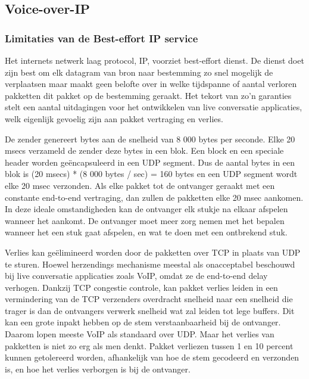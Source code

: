\subsection{Voice-over-IP}

\subsubsection{Limitaties van de Best-effort IP service}

Het internets netwerk laag protocol, IP, voorziet best-effort dienst. De dienst doet zijn best om elk datagram van bron naar bestemming zo snel mogelijk de verplaatsen maar maakt geen belofte over in welke tijdspanne of aantal verloren pakketten dit pakket op de bestemming geraakt. Het tekort van zo’n garanties stelt een aantal uitdagingen voor het ontwikkelen van live conversatie applicaties, welk eigenlijk gevoelig zijn aan pakket vertraging en verlies.

\noindent De zender genereert bytes aan de snelheid van 8 000 bytes per seconde. Elke 20 msecs verzameld de zender deze bytes in een blok. Een block en een speciale header worden geëncapsuleerd in een UDP segment. Dus de aantal bytes in een blok is (20 msecs) * (8 000 bytes / sec) = 160 bytes en een UDP segment wordt elke 20 msec verzonden.
Als elke pakket tot de ontvanger geraakt met een constante end-to-end vertraging, dan zullen de pakketten elke 20 msec aankomen. In deze ideale omstandigheden kan de ontvanger elk stukje na elkaar afspelen wanneer het aankomt.
De ontvanger moet meer zorg nemen met het bepalen wanneer het een stuk gaat afspelen, en wat te doen met een ontbrekend stuk.


Verlies kan geëlimineerd worden door de pakketten over TCP in plaats van UDP te sturen. Hoewel herzendings mechanisme meestal als onacceptabel beschouwd bij live conversatie applicaties zoals VoIP, omdat ze de end-to-end delay verhogen. Dankzij TCP congestie controle, kan pakket verlies leiden in een vermindering van de TCP verzenders overdracht snelheid naar een snelheid die trager is dan de ontvangers verwerk snelheid wat zal leiden tot lege buffers. Dit kan een grote inpakt hebben op de stem verstaanbaarheid bij de ontvanger. Daarom lopen meeste VoIP als standaard over UDP.
Maar het verlies van pakketten is niet zo erg als men denkt. Pakket verliezen tussen 1 en 10 percent kunnen getolereerd worden, afhankelijk van hoe de stem gecodeerd en verzonden is, en hoe het verlies verborgen is bij de ontvanger.

